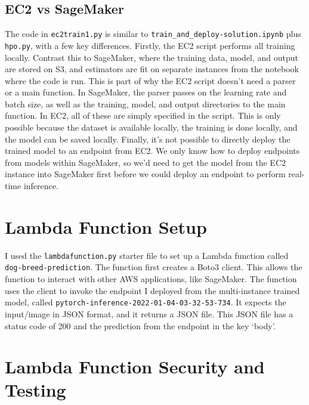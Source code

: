 \documentclass[11pt]{amsart}
\begin{document}
\subsection{EC2 vs SageMaker}
The code in \verb^ec2train1.py^ is similar to \verb^train_and_deploy-solution.ipynb^ plus \verb^hpo.py^, with a few key differences. Firstly, the EC2 script performs all training locally. Contrast this to SageMaker, where the training data, model, and output are stored on S3, and estimators are fit on separate instances from the notebook where the code is run. This is part of why the EC2 script doesn't need a parser or a main function. In SageMaker, the parser passes on the learning rate and batch size, as well as the training, model, and output directories to the main function. In EC2, all of these are simply specified in the script. This is only possible because the dataset is available locally, the training is done locally, and the model can be saved locally. Finally, it's not possible to directly deploy the trained model to an endpoint from EC2. We only know how to deploy endpoints from models within SageMaker, so we'd need to get the model from the EC2 instance into SageMaker first before we could deploy an endpoint to perform real-time inference.

\section{Lambda Function Setup}
I used the \verb^lambdafunction.py^ starter file to set up a Lambda function called \texttt{dog-breed-prediction}. The function first creates a Boto3 client. This allows the function to interact with other AWS applications, like SageMaker. The function uses the client to invoke the endpoint I deployed from the multi-instance trained model, called \texttt{pytorch-inference-2022-01-04-03-32-53-734}. It expects the input/image in JSON format, and it returns a JSON file. This JSON file has a status code of 200 and the prediction from the endpoint in the key `body'.

\section{Lambda Function Security and Testing}
\end{document}
